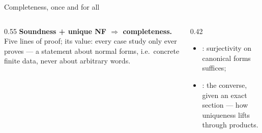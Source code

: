 \begin{frame}{Completeness, once and for all \InPaper}
\begin{code}[hide]%
\>[0]\AgdaSpace{}%
\AgdaSymbol{=}\AgdaSpace{}%
\<%
\end{code}
\begin{columns}[c]
\begin{column}{0.55\textwidth}
\small
\textbf{Soundness + unique NF $\Rightarrow$ completeness.} Five lines of proof;
its value: every case study only ever proves  --- a statement about
\alert{normal forms}, i.e.\ concrete finite data, never about arbitrary words.
\end{column}
\begin{column}{0.42\textwidth}
\small
\begin{itemize}
  \item {}: surjectivity on canonical forms suffices;
  \item {}: the converse, given an exact section --- how
        uniqueness lifts through products.
\end{itemize}
\end{column}
\end{columns}
\end{frame}

